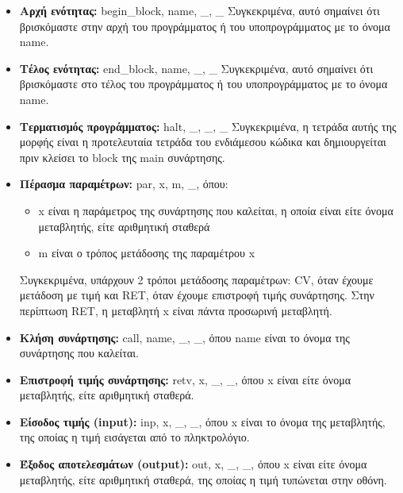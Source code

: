 \documentclass[12pt,a4paper]{article}
\begin{document}
\begin{itemize}
    \item \textbf{Αρχή ενότητας:} begin\_block, name, \_, \_
    Συγκεκριμένα, αυτό σημαίνει ότι βρισκόμαστε στην αρχή του προγράμματος ή του υποπρογράμματος με το όνομα name.

    \item \textbf{Τέλος ενότητας:} end\_block, name, \_, \_
    Συγκεκριμένα, αυτό σημαίνει ότι βρισκόμαστε στο τέλος του προγράμματος ή του υποπρογράμματος με το όνομα name.

    \item \textbf{Τερματισμός προγράμματος:} halt, \_, \_, \_
    Συγκεκριμένα, η τετράδα αυτής της μορφής είναι η προτελευταία τετράδα του ενδιάμεσου κώδικα και δημιουργείται πριν κλείσει το block της main συνάρτησης.

    \item \textbf{Πέρασμα παραμέτρων:} par, x, m, \_, όπου:
    \begin{itemize}
        \item x είναι η παράμετρος της συνάρτησης που καλείται, η οποία είναι είτε όνομα μεταβλητής, είτε αριθμητική σταθερά
        \item m είναι ο τρόπος μετάδοσης της παραμέτρου x
    \end{itemize}
    Συγκεκριμένα, υπάρχουν 2 τρόποι μετάδοσης παραμέτρων: CV, όταν έχουμε μετάδοση με τιμή και RET, όταν έχουμε επιστροφή τιμής συνάρτησης. Στην περίπτωση RET, η μεταβλητή x είναι πάντα προσωρινή μεταβλητή.

    \item \textbf{Κλήση συνάρτησης:} call, name, \_, \_, όπου name είναι το όνομα της συνάρτησης που καλείται.

    \item \textbf{Επιστροφή τιμής συνάρτησης:} retv, x, \_, \_, όπου x είναι είτε όνομα μεταβλητής, είτε αριθμητική σταθερά.

    \item \textbf{Είσοδος τιμής (input):} inp, x, \_, \_, όπου x είναι το όνομα της μεταβλητής, της οποίας η τιμή εισάγεται από το πληκτρολόγιο.

    \item \textbf{Έξοδος αποτελεσμάτων (output):} out, x, \_, \_, όπου x είναι είτε όνομα μεταβλητής, είτε αριθμητική σταθερά, της οποίας η τιμή τυπώνεται στην οθόνη.
\end{itemize}
\end{document}
